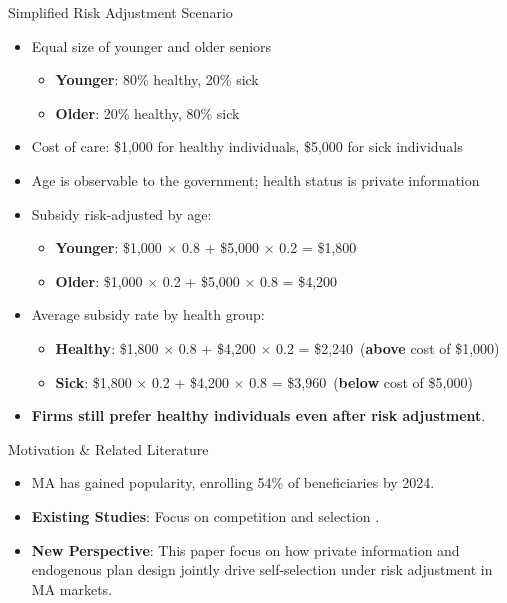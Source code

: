 \documentclass[professionalfonts, aspectratio=169]{beamer}
\begin{document}
\begin{frame}{Simplified Risk Adjustment Scenario}
  \begin{itemize}
    \item Equal size of younger and older seniors
    \begin{itemize}
      \item \textbf{Younger}: 80\% healthy, 20\% sick
      \item \textbf{Older}: 20\% healthy, 80\% sick
    \end{itemize}
    \item Cost of care: \$1,000 for healthy individuals, \$5,000 for sick individuals
    \item Age is observable to the government; health status is private information \pause
    \item Subsidy risk-adjusted by age:
    \begin{itemize}
      \item \textbf{Younger}: \$1,000 $\times$ 0.8 + \$5,000 $\times$ 0.2 = \$1,800
      \item \textbf{Older}: \$1,000 $\times$ 0.2 + \$5,000 $\times$ 0.8 = \$4,200
    \end{itemize}
    \item Average subsidy rate by health group:
    \begin{itemize}
      \item \textbf{Healthy}: \$1,800 $\times$ 0.8 + \$4,200 $\times$ 0.2 = \$2,240\ (\textbf{above} cost of \$1,000)
      \item \textbf{Sick}: \$1,800 $\times$ 0.2 + \$4,200 $\times$ 0.8 = \$3,960\ (\textbf{below} cost of \$5,000)
    \end{itemize}
    \item \textbf{Firms still prefer healthy individuals even after risk adjustment}.
  \end{itemize}
\end{frame}

\begin{frame}{Motivation \& Related Literature}
  \begin{itemize}
    \item MA has gained popularity, enrolling 54\% of beneficiaries by 2024.
    \item \textbf{Existing Studies}: Focus on competition \citep{curtoCanHealthInsurance2021,millerOptimalGeographicDistribution2023} and selection \citep{aizawaAdvertisingRiskSelection2018,brownHowDoesRisk2014}.
  \item \textbf{New Perspective}: This paper focus on how private information and endogenous plan design jointly drive self-selection under risk adjustment in MA markets.
  \end{itemize}
\end{frame}
\end{document}
